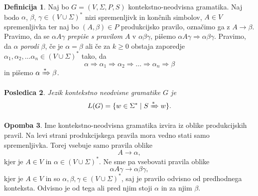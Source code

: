 \documentclass{amsart}
\theoremstyle{definition} %
\newtheorem{definicija}{Definicija}[section]
\newtheorem{opomba}[definicija]{Opomba}
\theoremstyle{plain} %
\newtheorem{posledica}[definicija]{Posledica}
\begin{document}
\begin{definicija}
    
    Naj bo $ G = ( V, \Sigma, P, S ) $ kontekstno-neodvisna gramatika. Naj bodo $ \alpha $,
    $ \beta $, $ \gamma \in ( V \cup \Sigma )^* $ nizi spremenljivk in končnih simbolov,
    $ A \in V $ spremenljivka ter naj bo $ ( A, \beta ) \in P $ produkcijsko pravilo,
    označimo ga z $ A \rightarrow \beta $. Pravimo, da se $ \alpha A \gamma $ 
    \textit{prepiše s pravilom} $ A $ v $ \alpha\beta\gamma $, pišemo $ \alpha A \gamma  \Rightarrow 
    \alpha\beta\gamma $. Pravimo, da $ \alpha $ \textit{porodi} $ \beta $, če je $ \alpha = \beta $ ali če
    za $ k \geq 0 $ obstaja zaporedje $ \alpha_1, \alpha_2, \ldots \alpha_n
    \in ( V \cup \Sigma )^* $ tako, da 
    \[
        \alpha \Rightarrow \alpha_1 \Rightarrow \alpha_2 \Rightarrow \ldots \Rightarrow \alpha_n
        \Rightarrow \beta
    \]
    in pišemo $ \alpha \xRightarrow{*} \beta $.

\end{definicija}

\begin{posledica}

    Jezik kontekstno neodvisne gramatike $ G $ je
    \[
        L(G) = \{ w \in \Sigma^* \mid S \xRightarrow{*} w \}.
    \]

\end{posledica}

\begin{opomba}
    
    Ime kontekstno-neodvisna gramatika izvira iz oblike produkcijskih pravil. Na levi
    strani produkcijskega pravila mora vedno stati samo spremenljivka. Torej vsebuje samo
    pravila oblike
    \[
        A \rightarrow \alpha,
    \]
    kjer je  $ A \in V $ in $ \alpha \in ( V \cup \Sigma )^* $. Ne sme pa vsebovati
    pravila oblike
    \[
        \alpha A \gamma \rightarrow \alpha\beta\gamma,
    \]
    kjer je $ A \in V $ in so $ \alpha, \beta, \gamma \in ( V \cup \Sigma )^* $, saj je
    pravilo odvisno od predhodnega konteksta. Odvisno je od tega ali pred njim stoji $ \alpha $
    in za njim $ \beta $.

\end{opomba}
\end{document}
